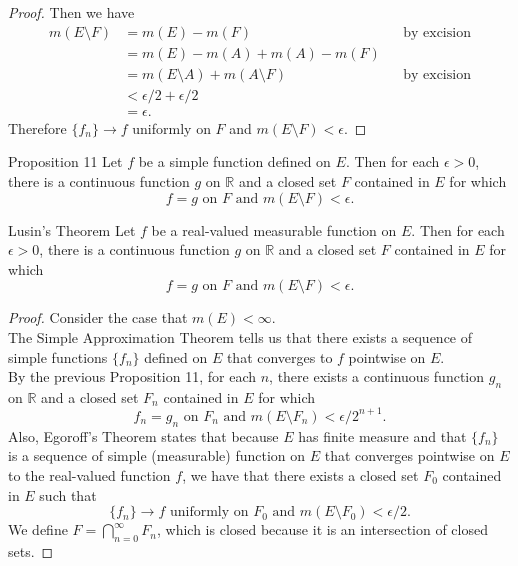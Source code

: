 \begin{flushleft}
\begin{proof}
        Then we have
        \begin{align*}
            m(E\setminus F)&=m(E)-m(F)&&\text{by excision}\\
            &= m(E)-m(A)+m(A)-m(F)\\
            &=m(E\setminus A)+m(A\setminus F)&&\text{by excision}\\
            &<\epsilon/2+\epsilon/2\\
            &=\epsilon.
        \end{align*}
        Therefore $\{f_n\}\to f$ uniformly on $F$ and $m(E\setminus F)<\epsilon$.
    \end{proof}
    \begin{namedthm*}{Proposition 11}
        Let $f$ be a simple function defined on $E$.
        Then for each $\epsilon>0$, there is a continuous function $g$ on $\mathbb{R}$ and a closed set $F$ contained in $E$ for which
        \[
            f=g\text{ on }F\text{ and }m(E\setminus F)<\epsilon.    
        \]
    \end{namedthm*}
    \begin{namedthm*}{Lusin's Theorem}
        Let $f$ be a real-valued measurable function on $E$.
        Then for each $\epsilon>0$, there is a continuous function $g$ on $\mathbb{R}$ and a closed set $F$ contained in $E$ for which 
        \[
            f=g\text{ on }F\text{ and }m(E\setminus F)<\epsilon.
        \]
    \end{namedthm*}
    \begin{proof}
        Consider the case that $m(E)<\infty$.
        \\The Simple Approximation Theorem tells us that there exists a sequence of simple functions $\{f_n\}$ defined on $E$ that converges to $f$ pointwise on $E$.
        \\By the previous Proposition 11, for each $n$, there exists a continuous function $g_n$ on $\mathbb{R}$ and a closed set $F_n$ contained in $E$ for which
        \[
            f_n=g_n\text{ on }F_n\text{ and }m(E\setminus F_n)<\epsilon/2^{n+1}.    
        \]
        Also, Egoroff's Theorem states that because $E$ has finite measure and that $\{f_n\}$ is a sequence of simple (measurable) function on $E$ that converges pointwise on $E$ to the real-valued function $f$, we have that there exists a closed set $F_0$ contained in $E$ such that
        \[
            \{f_n\}\to f\text{ uniformly on }F_0\text{ and }m(E\setminus F_0)<\epsilon/2.    
        \]
        We define $F=\bigcap_{n=0}^\infty F_n$, which is closed because it is an intersection of closed sets.

\end{proof}
\end{flushleft}
